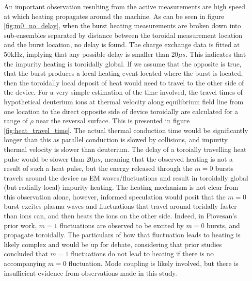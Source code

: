\begin{refsection}
An important observation resulting from the active measurements are high speed at which heating propagates around the machine. As can be seen in figure \ref{fig:m0_no_delay}, when the burst heating measurements are broken down into sub-ensembles separated by distance between the toroidal measurement location and the burst location, no delay is found. The charge exchange data is fitted at 50kHz, implying that any possible delay is smaller than 20$\mu s$. This indicates that the impurity heating is toroidally global. If we assume that the opposite is true, that the burst produces a local heating event located where the burst is located, then the toroidally local deposit of heat would need to travel to the other side of the device. For a very simple estimation of the time involved, the travel times of hypothetical deuterium ions at thermal velocity along equilibrium field line from one location to the direct opposite side of device toroidally are calculated for a range of $\rho$ near the reversal surface. This is presented in figure \ref{fig:heat_travel_time}. The actual thermal conduction time would be significantly longer than this as parallel conduction is slowed by collisions, and impurity thermal velocity is slower than deuterium. The delay of a toroially travelling heat pulse would be slower than 20$\mu s$, meaning that the observed heating is not a result of such a heat pulse, but the energy released through the $m = 0$ bursts travels around the device as EM waves/fluctuations and result in toroidally global (but radially local) impurity heating. The heating mechanism is not clear from this observation alone, however, informed speculation would posit that the $m = 0$ burst excites plasma waves and fluctuations that travel around toridally faster than ions can, and then heats the ions on the other side. Indeed, in Piovesan's prior work, $m = 1$ fluctuations are observed to be excited by $m = 0$ bursts, and propagate toroidally\cite{Piovesan2008}. The particulars of how that fluctuation leads to heating is likely complex and would be up for debate, considering that prior studies concluded that $m = 1$ fluctuations do not lead to heating if there is no accompanying $m = 0$ fluctuation. Mode coupling is likely involved, but there is insufficient evidence from observations made in this study.


\end{refsection}
